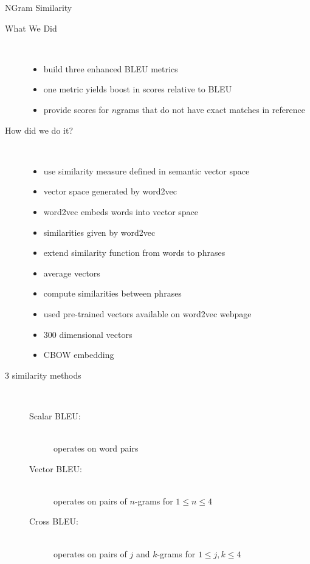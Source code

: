 \begin{block}{NGram Similarity}
\begin{description}
\item[What We Did] \hfill \\
\begin{itemize}
\item 
build three enhanced BLEU metrics
\item 
one   metric yields  boost in scores relative to BLEU
\item 
provide scores for $n$grams that do not have exact matches in  reference
\end{itemize}
\item[How did we do it?] \hfill \\
\begin{itemize}
\item 
use  similarity measure defined in  semantic vector space
\item 
vector space generated by  word2vec
\item 
word2vec embeds words  into  vector space
\item 
similarities  given  by word2vec
\item 
extend similarity function   from words to phrases
\item 
average vectors
\item 
compute similarities between phrases
\item 
used  pre-trained vectors available  on  word2vec webpage
\item 
$300$ dimensional vectors
\item 
CBOW embedding
\end{itemize}
\item[3 similarity methods] \hfill \\
\begin{description}
\item[Scalar BLEU:] \hfill \\
operates on word pairs
\item[Vector BLEU:] \hfill \\
operates on pairs of $n$-grams for $1 \leq n \leq 4$
\item[Cross BLEU:] \hfill \\
operates on pairs of $j$ and $k$-grams 
for $1 \leq j,k \leq 4$
\end{description}
\end{description}

\end{block}
